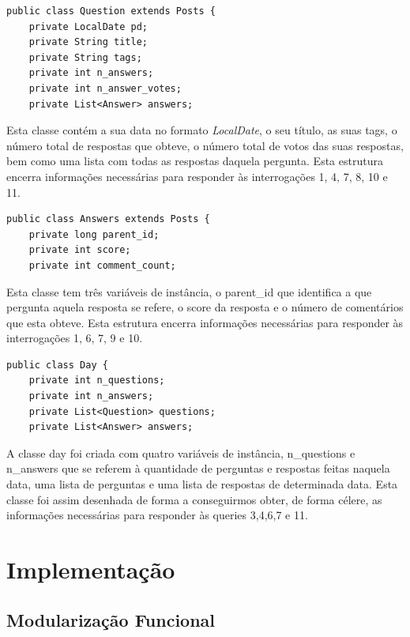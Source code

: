 \documentclass[a4paper]{article}
\begin{document}
\begin{verbatim}
public class Question extends Posts {
    private LocalDate pd;
    private String title;
    private String tags;
    private int n_answers;
    private int n_answer_votes;
    private List<Answer> answers;
\end{verbatim}


Esta classe contém a sua data no formato \textit{LocalDate}, o seu título,
as suas tags, o número total de respostas que obteve, o número total de votos
das suas respostas, bem como uma lista com todas as respostas daquela pergunta.
Esta estrutura encerra informações necessárias para responder às interrogações 1,
4, 7, 8, 10 e 11.


\begin{verbatim}
public class Answers extends Posts {
    private long parent_id;
    private int score;
    private int comment_count;
\end{verbatim}

Esta classe tem três variáveis de instância, o parent\_id que identifica a que
pergunta aquela resposta se refere, o score da resposta e o número de comentários
que esta obteve.
Esta estrutura encerra informações necessárias para responder às interrogações 1,
6, 7, 9 e 10.

\begin{verbatim}
public class Day {
    private int n_questions;
    private int n_answers;
    private List<Question> questions;
    private List<Answer> answers;
\end{verbatim}

A classe day foi criada com quatro variáveis de instância, n\_questions e n\_answers
que se referem à quantidade de perguntas e respostas feitas naquela data, uma lista
de perguntas e uma lista de respostas de determinada data. Esta classe foi assim
desenhada de forma a conseguirmos obter, de forma célere, as informações necessárias
para responder às queries 3,4,6,7 e 11.


\section{Implementação}
\label{sec:implementacao}

\subsection{Modularização Funcional}
\label{sec:organizacao}
\end{document}
